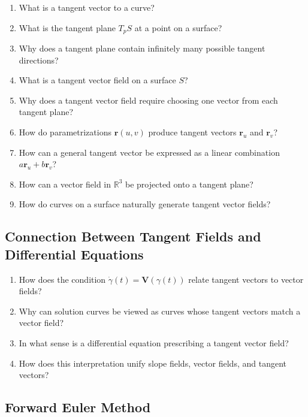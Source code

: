\begin{enumerate}[resume]
  \item What is a tangent vector to a curve?
  \item What is the tangent plane \(T_{p} S\) at a point on a surface?
  \item Why does a tangent plane contain infinitely many possible tangent directions?
  \item What is a tangent vector field on a surface \(S\)?
  \item Why does a tangent vector field require choosing one vector from each tangent plane?
  \item How do parametrizations \(\mathbf{r}(u,v)\) produce tangent vectors \(\mathbf{r}_{u}\) and \(\mathbf{r}_{v}\)?
  \item How can a general tangent vector be expressed as a linear combination \(a\mathbf{r}_{u} + b\mathbf{r}_{v}\)?
  \item How can a vector field in \(\mathbb{R}^{3}\) be projected onto a tangent plane?
  \item How do curves on a surface naturally generate tangent vector fields?
\end{enumerate}

\subsection{Connection Between Tangent Fields and Differential Equations}

\begin{enumerate}[resume]
  \item How does the condition \(\dot{\gamma}(t) = \mathbf{V}(\gamma(t))\) relate tangent vectors to vector fields?
  \item Why can solution curves be viewed as curves whose tangent vectors match a vector field?
  \item In what sense is a differential equation prescribing a tangent vector field?
  \item How does this interpretation unify slope fields, vector fields, and tangent vectors?
\end{enumerate}

\subsection{Forward Euler Method}

